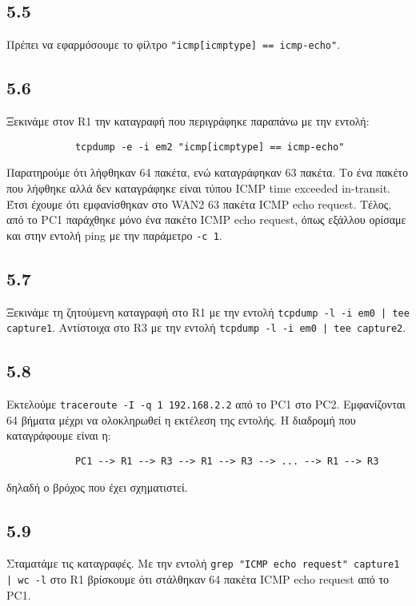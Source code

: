 \documentclass[a4paper, 12pt]{article}
\begin{document}
	\subsection*{5.5} 
		Πρέπει να εφαρμόσουμε το φίλτρο \verb|"icmp[icmptype] == icmp-echo"|.

	\subsection*{5.6} 
		Ξεκινάμε στον R1 την καταγραφή που περιγράφηκε παραπάνω με την εντολή:
		
		\begin{verbatim}
			tcpdump -e -i em2 "icmp[icmptype] == icmp-echo"
		\end{verbatim} 
		
		Παρατηρούμε ότι λήφθηκαν 64 πακέτα, ενώ καταγράφηκαν 63 πακέτα. Το ένα πακέτο που λήφθηκε αλλά δεν καταγράφηκε είναι τύπου ICMP time exceeded in-transit. Έτσι έχουμε ότι εμφανίσθηκαν στο WAN2 63 πακέτα ICMP echo request. Τέλος, από το PC1 παράχθηκε μόνο ένα πακέτο ICMP echo request, όπως εξάλλου ορίσαμε και στην εντολή ping με την παράμετρο \verb|-c 1|. 

	\subsection*{5.7} 
		Ξεκινάμε τη ζητούμενη καταγραφή στο R1 με την εντολή \verb+tcpdump -l -i em0 | tee capture1+. Αντίστοιχα στο R3 με την εντολή \verb+tcpdump -l -i em0 | tee capture2+.

	\subsection*{5.8} 
		Εκτελούμε \verb|traceroute -I -q 1 192.168.2.2| από το PC1 στο PC2. Εμφανίζονται 64 βήματα μέχρι να ολοκληρωθεί η εκτέλεση της εντολής. Η διαδρομή που καταγράφουμε είναι η:
		
		\begin{verbatim}
			PC1 --> R1 --> R3 --> R1 --> R3 --> ... --> R1 --> R3
		\end{verbatim}
		
		δηλαδή ο βρόχος που έχει σχηματιστεί.

	\subsection*{5.9} 
		Σταματάμε τις καταγραφές. Με την εντολή \verb+grep "ICMP echo request" capture1 | wc -l+ στο R1 βρίσκουμε ότι στάλθηκαν 64 πακέτα ICMP echo request από το PC1. 
\end{document}
